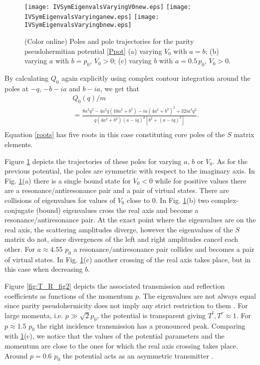 \begin{figure}[h]
    \texttt{[image: IVSymEigenvalsVaryingV0new.eps]}
    \texttt{[image: IVSymEigenvalsVaryinganew.eps]}
    \texttt{[image: IVSymEigenvalsVaryingbnew.eps]}
    \caption{(Color online) Poles and pole trajectories for the parity pseudohermitian potential \eqref{Ppot} (a) varying $V_0$ with $a=b$; (b) varying $a$ with $b=p_0$, $V_0>0$; (c) varying $b$ with $a=0.5\, p_0$, $V_0>0$.}
    \label{fig:IVSymEigenvals}
\end{figure}



By calculating $Q_{0}$ again explicitly using complex contour integration around the poles at $-q$, $-b-i a$ and $b-i a$, we get that
%
\begin{eqnarray}
&&Q_{0}(q)/m
\nonumber\\
&&=\frac{8 a^2 q^3-4 a^2 q \left(10 a^2+b^2\right)-i a \left(4 a^2+b^2\right)^2+32 i a^3 q^2}{q \left(4 a^2+b^2\right) (a-i q)^2 \left[b^2+(a-i q)^2\right]}.
\nonumber\\
\end{eqnarray}
%
Equation \eqref{roots} has five roots in this case constituting core poles of the $S$ matrix elements.

Figure \ref{fig:IVSymEigenvals} depicts the trajectories of these poles for varying $a$, $b$ or $V_0$. As for the previous potential, the poles are symmetric with respect to the imaginary axis. In Fig. \ref{fig:IVSymEigenvals}(a) there is a single bound state for $V_0<0$ while for positive values there are a resonance/antiresonance pair and a pair of virtual states. There are collisions of eigenvalues for values of $V_0$ close to 0. In Fig. \ref{fig:IVSymEigenvals}(b)  two complex-conjugate (bound) eigenvalues cross the real axis and become a resonance/antiresonance pair. At the exact point where the eigenvalues are on the real axis, the scattering amplitudes diverge, however the eigenvalues of the $S$ matrix do not, since divergences of the left and right amplitudes cancel each other. For $a  \approx 4.55$ $p_0$ a resonance/antiresonance pair collides and becomes a pair of virtual states. In Fig. \ref{fig:IVSymEigenvals}(c) another crossing of the real axis takes place, but in this case when decreasing $b$.

Figure \ref{fig:T_R_fig2} depicts the associated transmission and reflection coefficients as functions of the momentum $p$. The eigenvalues are not always equal since parity pseudohermicity does not imply any strict restriction to them \cite{Ruschhaupt2017}. For large  momenta, i.e. $p \gg \sqrt{2} p_0$, the potential is transparent giving $T^l,T^r \approx 1$. For $p\approx 1.5$ $p_0$ the right incidence transmission has a pronounced peak. Comparing with \ref{fig:IVSymEigenvals}(c), we notice that the values of the potential parameters and the momentum are close to the ones for which the real axis crossing takes place. Around $p = 0.6$ $p_0$ the potential acts as an asymmetric transmitter
\cite{Ruschhaupt2017}.


